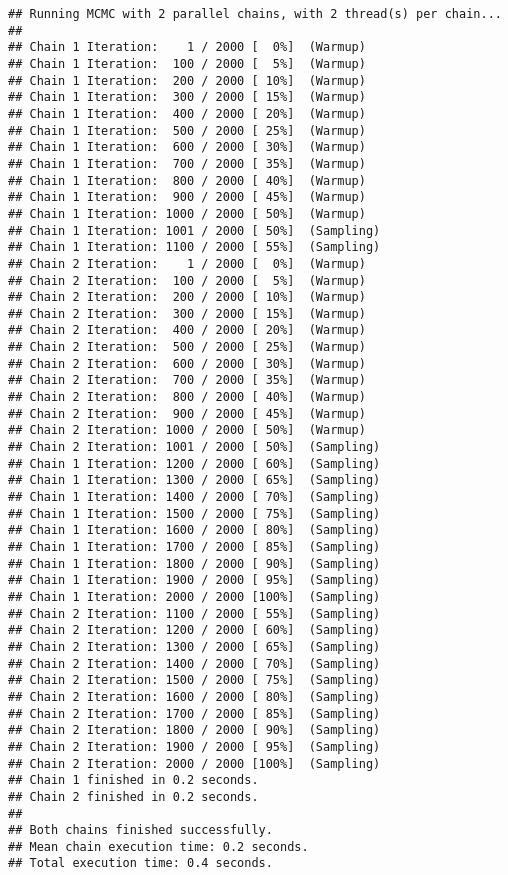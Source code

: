 \documentclass[
]{article}
\begin{document}
\begin{verbatim}
## Running MCMC with 2 parallel chains, with 2 thread(s) per chain...
## 
## Chain 1 Iteration:    1 / 2000 [  0%]  (Warmup) 
## Chain 1 Iteration:  100 / 2000 [  5%]  (Warmup) 
## Chain 1 Iteration:  200 / 2000 [ 10%]  (Warmup) 
## Chain 1 Iteration:  300 / 2000 [ 15%]  (Warmup) 
## Chain 1 Iteration:  400 / 2000 [ 20%]  (Warmup) 
## Chain 1 Iteration:  500 / 2000 [ 25%]  (Warmup) 
## Chain 1 Iteration:  600 / 2000 [ 30%]  (Warmup) 
## Chain 1 Iteration:  700 / 2000 [ 35%]  (Warmup) 
## Chain 1 Iteration:  800 / 2000 [ 40%]  (Warmup) 
## Chain 1 Iteration:  900 / 2000 [ 45%]  (Warmup) 
## Chain 1 Iteration: 1000 / 2000 [ 50%]  (Warmup) 
## Chain 1 Iteration: 1001 / 2000 [ 50%]  (Sampling) 
## Chain 1 Iteration: 1100 / 2000 [ 55%]  (Sampling) 
## Chain 2 Iteration:    1 / 2000 [  0%]  (Warmup) 
## Chain 2 Iteration:  100 / 2000 [  5%]  (Warmup) 
## Chain 2 Iteration:  200 / 2000 [ 10%]  (Warmup) 
## Chain 2 Iteration:  300 / 2000 [ 15%]  (Warmup) 
## Chain 2 Iteration:  400 / 2000 [ 20%]  (Warmup) 
## Chain 2 Iteration:  500 / 2000 [ 25%]  (Warmup) 
## Chain 2 Iteration:  600 / 2000 [ 30%]  (Warmup) 
## Chain 2 Iteration:  700 / 2000 [ 35%]  (Warmup) 
## Chain 2 Iteration:  800 / 2000 [ 40%]  (Warmup) 
## Chain 2 Iteration:  900 / 2000 [ 45%]  (Warmup) 
## Chain 2 Iteration: 1000 / 2000 [ 50%]  (Warmup) 
## Chain 2 Iteration: 1001 / 2000 [ 50%]  (Sampling) 
## Chain 1 Iteration: 1200 / 2000 [ 60%]  (Sampling) 
## Chain 1 Iteration: 1300 / 2000 [ 65%]  (Sampling) 
## Chain 1 Iteration: 1400 / 2000 [ 70%]  (Sampling) 
## Chain 1 Iteration: 1500 / 2000 [ 75%]  (Sampling) 
## Chain 1 Iteration: 1600 / 2000 [ 80%]  (Sampling) 
## Chain 1 Iteration: 1700 / 2000 [ 85%]  (Sampling) 
## Chain 1 Iteration: 1800 / 2000 [ 90%]  (Sampling) 
## Chain 1 Iteration: 1900 / 2000 [ 95%]  (Sampling) 
## Chain 1 Iteration: 2000 / 2000 [100%]  (Sampling) 
## Chain 2 Iteration: 1100 / 2000 [ 55%]  (Sampling) 
## Chain 2 Iteration: 1200 / 2000 [ 60%]  (Sampling) 
## Chain 2 Iteration: 1300 / 2000 [ 65%]  (Sampling) 
## Chain 2 Iteration: 1400 / 2000 [ 70%]  (Sampling) 
## Chain 2 Iteration: 1500 / 2000 [ 75%]  (Sampling) 
## Chain 2 Iteration: 1600 / 2000 [ 80%]  (Sampling) 
## Chain 2 Iteration: 1700 / 2000 [ 85%]  (Sampling) 
## Chain 2 Iteration: 1800 / 2000 [ 90%]  (Sampling) 
## Chain 2 Iteration: 1900 / 2000 [ 95%]  (Sampling) 
## Chain 2 Iteration: 2000 / 2000 [100%]  (Sampling) 
## Chain 1 finished in 0.2 seconds.
## Chain 2 finished in 0.2 seconds.
## 
## Both chains finished successfully.
## Mean chain execution time: 0.2 seconds.
## Total execution time: 0.4 seconds.
\end{verbatim}
\end{document}
